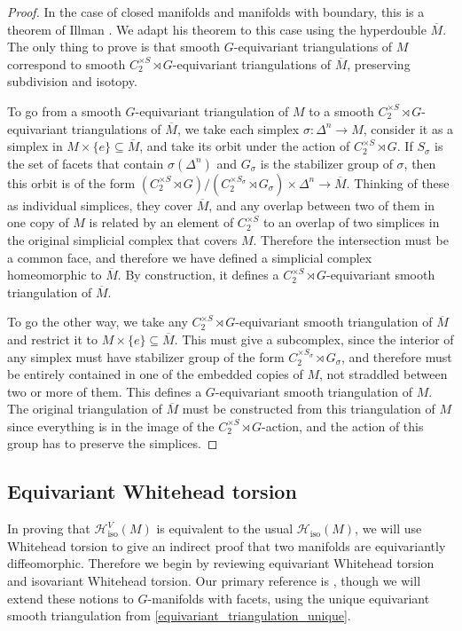 \documentclass[11pt]{amsart}
\theoremstyle{definition}
\numberwithin{equation}{section}
\numberwithin{figure}{section}
\newcommand{\mc}{\mathcal}
\newcommand{\iso}{\mathrm{iso}}
\begin{document}
\begin{proof}
	In the case of closed manifolds and manifolds with boundary, this is a theorem of Illman \cite{illman_finite}. We adapt his theorem to this case using the hyperdouble $\overline{M}$. The only thing to prove is that smooth $G$-equivariant triangulations of $M$ correspond to smooth $C_2^{\times S} \rtimes G$-equivariant triangulations of $\overline{M}$, preserving subdivision and isotopy.
	
	To go from a smooth $G$-equivariant triangulation of $M$ to a smooth $C_2^{\times S} \rtimes G$-equivariant triangulations of $\overline{M}$, we take each simplex $\sigma\colon \Delta^n \to M$, consider it as a simplex in $M \times \{e\} \subseteq \overline{M}$, and take its orbit under the action of $C_2^{\times S} \rtimes G$. If $S_\sigma$ is the set of facets that contain $\sigma(\Delta^n)$ and $G_\sigma$ is the stabilizer group of $\sigma$, then this orbit is of the form $(C_2^{\times S} \rtimes G) / (C_2^{\times S_\sigma} \rtimes G_\sigma) \times \Delta^n \to \overline{M}$. Thinking of these as individual simplices, they cover $\overline{M}$, and any overlap between two of them in one copy of $M$ is related by an element of $C_2^{\times S}$ to an overlap of two simplices in the original simplicial complex that covers $M$. Therefore the intersection must be a common face, and therefore we have defined a simplicial complex homeomorphic to $\overline{M}$. By construction, it defines a $C_2^{\times S} \rtimes G$-equivariant smooth triangulation of $\overline{M}$.
	
	To go the other way, we take any $C_2^{\times S} \rtimes G$-equivariant smooth triangulation of $\overline{M}$ and restrict it to $M \times \{e\} \subseteq \overline{M}$. This must give a subcomplex, since the interior of any simplex must have stabilizer group of the form $C_2^{\times S_\sigma} \rtimes G_\sigma$, and therefore must be entirely contained in one of the embedded copies of $M$, not straddled between two or more of them. This defines a $G$-equivariant smooth triangulation of $M$. The original triangulation of $\overline{M}$ must be constructed from this triangulation of $M$ since everything is in the image of the $C_2^{\times S} \rtimes G$-action, and the action of this group has to preserve the simplices.
\end{proof}


\subsection{Equivariant Whitehead torsion}
In proving that $\mc H_{\iso}^{V}(M)$ is equivalent to the usual $\mc H_\iso(M)$, we will use Whitehead torsion to give an indirect proof that two manifolds are equivariantly diffeomorphic. Therefore we begin by reviewing equivariant Whitehead torsion and isovariant Whitehead torsion. Our primary reference is \cite{luck}, though we will extend these notions to $G$-manifolds with facets, using the unique equivariant smooth triangulation from \autoref{equivariant_triangulation_unique}.
\end{document}

